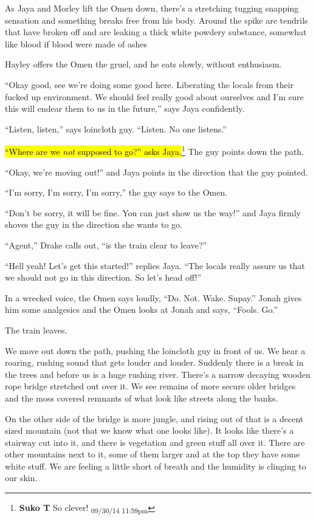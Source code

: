As Jaya and Morley lift the Omen down, there's a stretching tugging snapping sensation and something breaks free from his body.  Around the spike are tendrils that have broken off and are leaking a thick white powdery substance, somewhat like blood if blood were made of ashes

Hayley offers the Omen the gruel, and he eats slowly, without enthusiasm.

``Okay good, see we're doing some good here.  Liberating the locals from their fucked up environment.  We should feel really good about ourselves and I'm sure this will endear them to us in the future,'' says Jaya confidently.

``Listen, listen,'' says loincloth guy. ``Listen. No one listens.''

\hl{``Where are we \textit{not} supposed to go?'' asks Jaya.}\footnote{\textbf{Suko T }So clever! \textsubscript{09/30/14 11:59pm}}  The guy points down the path.

``Okay, we're moving out!'' and Jaya points in the direction that the guy pointed.

``I'm sorry, I'm sorry, I'm sorry,'' the guy says to the Omen.

``Don't be sorry, it will be fine.  You can just show us the way!'' and Jaya firmly shoves the guy in the direction she wants to go.

``Agent,'' Drake calls out, ``is the train clear to leave?''

``Hell yeah!  Let's get this started!'' replies Jaya.  ``The locals really assure us that we should not go in this direction.  So let's head off!''

In a wrecked voice, the Omen says loudly, ``Do.  Not.  Wake.  Supay.''  Jonah gives him some analgesics and the Omen looks at Jonah and says, ``Fools.  Go.''



The train leaves.





We move out down the path, pushing the loincloth guy in front of us.  We hear a roaring, rushing sound that gets louder and louder.  Suddenly there is a break in the trees and before us is a huge rushing river.  There's a narrow decaying wooden rope bridge stretched out over it. We see remains of more secure older bridges and the moss covered remnants of what look like streets along the banks.  



On the other side of the bridge is more jungle, and rising out of that is a decent sized mountain (not that we know what one looks like).  It looks like there's a stairway cut into it, and there is vegetation and green stuff all over it.  There are other mountains next to it, some of them larger and at the top they have some white stuff.  We are feeling a little short of breath and the humidity is clinging to our skin.



